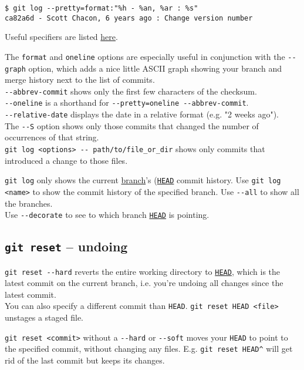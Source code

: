 \documentclass[8pt, table, xcdraw]{article}%
\begin{document}
\begin{lstlisting}
$ git log --pretty=format:"%h - %an, %ar : %s"
ca82a6d - Scott Chacon, 6 years ago : Change version number
\end{lstlisting}

Useful specifiers are listed \href{https://git-scm.com/book/en/v2/Git-Basics-Viewing-the-Commit-History#pretty_format}{here}.

The \lstinline{format} and \lstinline{oneline} options are especially useful in conjunction with the \lstinline{--graph} option, which adds a nice little ASCII graph showing your branch and merge history next to the list of commits.\\
\lstinline{--abbrev-commit} shows only the first few characters of the checksum.\\
\lstinline{--oneline} is a shorthand for \lstinline{--pretty=oneline --abbrev-commit}.\\
\lstinline{--relative-date} displays the date in a relative format (e.g. "2 weeks ago").\\
The \lstinline{--S} option shows only those commits that changed the number of occurrences of that string.\\
\lstinline{git log <options> -- path/to/file_or_dir} shows only commits that introduced a change to those files.

\lstinline{git log} only shows the current \hyperref[branching]{branch}'s (\hyperref[branching]{\lstinline{HEAD}} commit history. Use \lstinline{git log <name>} to show the commit history of the specified branch. Use \lstinline{--all} to show all the branches.\\
Use \lstinline{--decorate} to see to which branch \hyperref[branching]{\lstinline{HEAD}} is pointing.

\subsection{\lstinline{git reset} -- undoing} \label{reset}

\lstinline{git reset --hard} reverts the entire working directory to \hyperref[branching]{\lstinline{HEAD}}, which is the latest commit on the current branch, i.e. you're undoing all changes since the latest commit.\\
You can also specify a different commit than \lstinline{HEAD}.
\lstinline{git reset HEAD <file>} unstages a staged file.

\lstinline{git reset <commit>} without a \lstinline{--hard} or \lstinline{--soft} moves your \lstinline{HEAD} to point to the specified commit, without changing any files. E.g. \lstinline{git reset HEAD^} will get rid of the last commit but keeps its changes.
\end{document}
